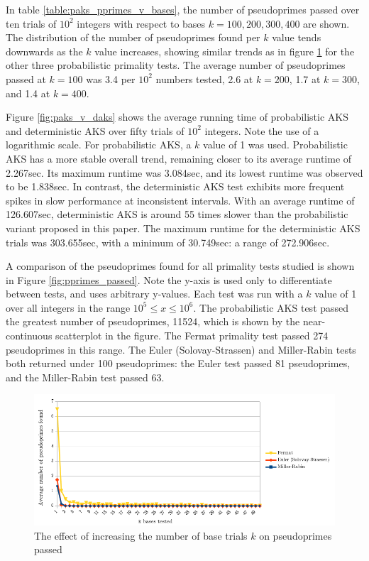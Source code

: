 \documentclass{article}
\begin{document}
In table \ref{table:paks_pprimes_v_bases}, the number of pseudoprimes passed over ten trials of $10^2$ integers with respect to bases $k=100,200,300,400$ are shown. The distribution of the number of pseudoprimes found per $k$ value tends downwards as the $k$ value increases, showing similar trends as in figure \ref{fig:pprimes_v_bases} for the other three probabilistic primality tests. The average number of pseudoprimes passed at $k = 100$ was 3.4 per $10^2$ numbers tested, 2.6 at $k=200$, 1.7 at $k=300$, and 1.4 at $k=400$.

Figure \ref{fig:paks_v_daks} shows the average running time of probabilistic AKS and deterministic AKS over fifty trials of $10^2$ integers. Note the use of a logarithmic scale. For probabilistic AKS, a $k$ value of 1 was used. Probabilistic AKS has a more stable overall trend, remaining closer to its average runtime of 2.267sec. Its maximum runtime was 3.084sec, and its lowest runtime was observed to be 1.838sec. In contrast, the deterministic AKS test exhibits more frequent spikes in slow performance at inconsistent intervals. With an average runtime of 126.607sec, deterministic AKS is around 55 times slower than the probabilistic variant proposed in this paper. The maximum runtime for the deterministic AKS trials was 303.655sec, with a minimum of 30.749sec: a range of 272.906sec.

A comparison of the pseudoprimes found for all primality tests studied is shown in Figure \ref{fig:pprimes_passed}. Note the y-axis is used only to differentiate between tests, and uses arbitrary y-values. Each test was run with a $k$ value of 1 over all integers in the range $10^5 \leq x \leq 10^6$. The probabilistic AKS test passed the greatest number of pseudoprimes, 11524, which is shown by the near-continuous scatterplot in the figure. The Fermat primality test passed 274 pseudoprimes in this range. The Euler (Solovay-Strassen) and Miller-Rabin tests both returned under 100 pseudoprimes: the Euler test passed 81 pseudoprimes, and the Miller-Rabin test passed 63.

\FloatBarrier
\begin{figure}[h!]
\caption{The effect of increasing the number of base trials $k$ on pseudoprimes passed}
\label{fig:pprimes_v_bases}
\centering
\includegraphics[width=\textwidth]{pprimes_v_bases}
\end{figure}
\FloatBarrier
\end{document}
